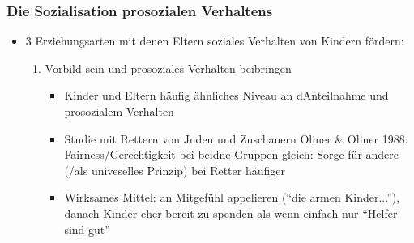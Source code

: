 \subsubsection{Die Sozialisation prosozialen Verhaltens}
\begin{itemize}
	\item
		3 Erziehungsarten mit denen Eltern soziales Verhalten von Kindern fördern:
		\begin{enumerate}
			\item
				Vorbild sein und prosoziales Verhalten beibringen
				\begin{itemize}
					\item
						Kinder und Eltern häufig ähnliches Niveau an dAnteilnahme und prosozialem Verhalten
					\item
						Studie mit Rettern von Juden und Zuschauern Oliner \& Oliner 1988: Fairness/Gerechtigkeit bei beidne Gruppen gleich: Sorge für andere (/als univeselles Prinzip) bei Retter häufiger
					\item
						Wirksames Mittel: an Mitgefühl appelieren (\enquote{die armen Kinder...}), danach Kinder eher bereit zu spenden als wenn einfach nur \enquote{Helfer sind gut}
				\end{itemize}


\end{enumerate}
\end{itemize}
